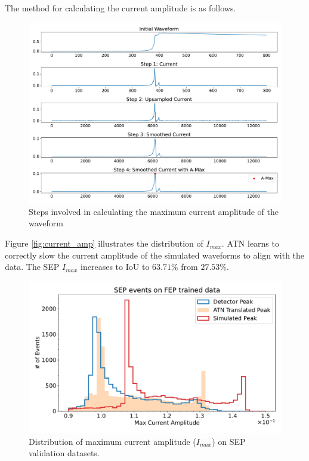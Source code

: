 The method for calculating the current amplitude is as follows. 
\begin{figure}[!htb]
    \centering
    \includegraphics[width=0.99\linewidth, trim={0pc 1pc 0pc 0pc},clip]{ch8/figs/curr_amp_calc.pdf}
    \caption{Steps involved in calculating the maximum current amplitude of the waveform}
    \label{fig:ch8:curr_amp_calc}
\end{figure}

Figure \ref{fig:current_amp} illustrates the distribution of $I_{max}$.  ATN learns to correctly slow the current amplitude of the simulated waveforms to align with the data. The SEP $I_{max}$ increases to IoU to $63.71\%$ from $27.53\%$.
  
\begin{figure}[htb!]
\centering
\includegraphics[width=0.99\linewidth,trim={0pc 0pc 0pc 0pc},clip]{ch8/figs/SEP_amp.pdf}
\caption{ Distribution of maximum current amplitude ($I_{max}$) on SEP validation datasets.}
\label{fig:current_amp_sep}
\end{figure}

